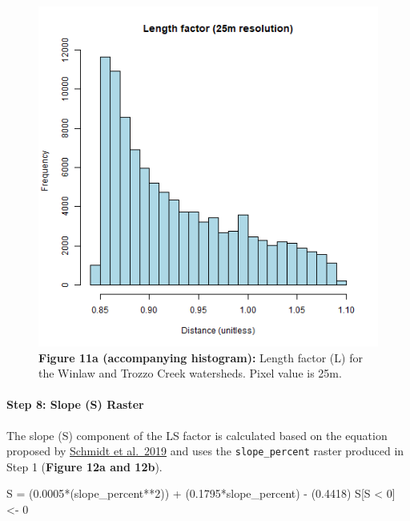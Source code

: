 \documentclass[
]{article}
\newenvironment{Shaded}{\begin{snugshade}}{\end{snugshade}}
\newcommand{\DecValTok}[1]{\textcolor[rgb]{0.00,0.00,0.81}{#1}}
\newcommand{\FloatTok}[1]{\textcolor[rgb]{0.00,0.00,0.81}{#1}}
\newcommand{\NormalTok}[1]{#1}
\newcommand{\OtherTok}[1]{\textcolor[rgb]{0.56,0.35,0.01}{#1}}
\newcommand{\SpecialCharTok}[1]{\textcolor[rgb]{0.00,0.00,0.00}{#1}}
\begin{document}
\begin{figure}
\centering
\includegraphics{img/L_25m_hist.png}
\caption{\textbf{Figure 11a (accompanying histogram):} Length factor (L) for the Winlaw and Trozzo Creek watersheds. Pixel value is 25m.}
\end{figure}

\hypertarget{sec-step-8-ls}{%
\paragraph*{Step 8: Slope (S) Raster}\label{sec-step-8-ls}}

The slope (S) component of the LS factor is calculated based on the equation proposed by \href{https://www.tandfonline.com/doi/full/10.1080/17445647.2019.1585980}{Schmidt et al.~2019} and uses the \texttt{slope\_percent} raster produced in Step 1 (\textbf{Figure 12a and 12b}).

\begin{Shaded}
\begin{Highlighting}[]
\NormalTok{S }\OtherTok{=}\NormalTok{ (}\FloatTok{0.0005}\SpecialCharTok{*}\NormalTok{(slope\_percent}\SpecialCharTok{**}\DecValTok{2}\NormalTok{)) }\SpecialCharTok{+}\NormalTok{ (}\FloatTok{0.1795}\SpecialCharTok{*}\NormalTok{slope\_percent) }\SpecialCharTok{{-}}\NormalTok{ (}\FloatTok{0.4418}\NormalTok{)}
\NormalTok{S[S }\SpecialCharTok{\textless{}} \DecValTok{0}\NormalTok{] }\OtherTok{\textless{}{-}} \DecValTok{0}
\end{Highlighting}
\end{Shaded}
\end{document}
